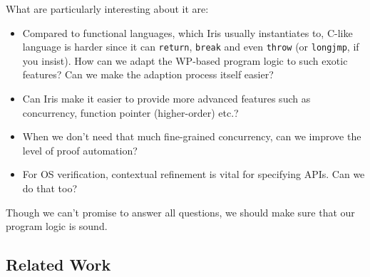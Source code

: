 What are particularly interesting about it are:

\begin{itemize}
\item Compared to functional languages, which Iris usually instantiates to, C-like language is harder since
      it can \texttt{return}, \texttt{break} and even \texttt{throw} (or \texttt{longjmp}, if you insist).
      How can we adapt the WP-based program logic to such exotic features? Can we make the adaption process
      itself easier?
\item Can Iris make it easier to provide more advanced features such as
      concurrency, function pointer (higher-order) etc.?
\item When we don't need that much fine-grained concurrency, can we improve the level of
      proof automation?
\item For OS verification, contextual refinement is vital for specifying APIs. Can we do that too?
\end{itemize}

Though we can't promise to answer all questions, we should make sure that our program logic is sound.

\subsection{Related Work}
